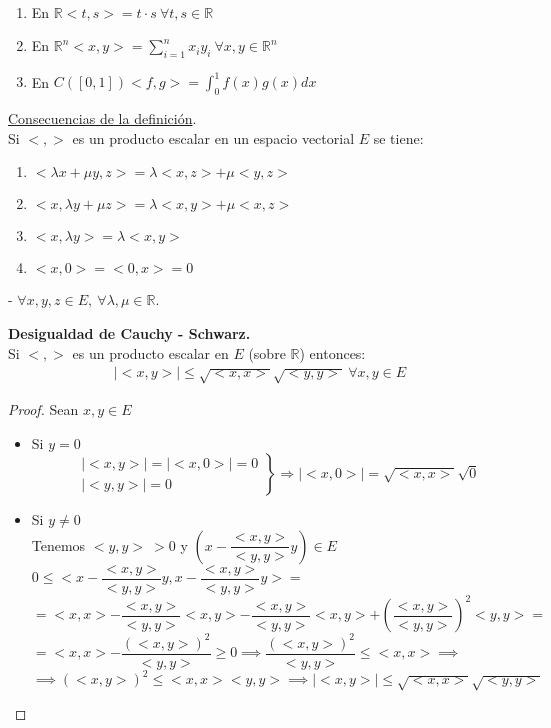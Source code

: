 	\begin{ejem} \ 
		\begin{enumerate}[1)]
	 		\item En $\mathbb{R} <t,s>=t\cdot s \ \forall t,s \in \mathbb{R}$
	 		\item En $\mathbb{R}^n <x,y> = \sum^n_{i=1}x_iy_i \ \forall x,y \in \mathbb{R}^n$
	 		\item En $C([0,1]) <f,g>=\int ^1_0 f(x)g(x)dx$
		\end{enumerate}
	\end{ejem}
	
	\begin{corolario} \underline{Consecuencias de la definici\'on}. \\ 
		Si $<,>$ es un producto escalar en un espacio vectorial $E$ se tiene:
		\begin{enumerate}[1)]
			\item $<\lambda x+ \mu y, z>=\lambda <x,z>+\mu <y,z>$
			\item $<x, \lambda y+\mu z> = \lambda <x,y>+\mu <x,z>$
			\item $<x,\lambda y> = \lambda <x,y>$
			\item $<x,0>=<0,x>=0$
		\end{enumerate}
		- $ \forall x,y,z\in E,\ \forall \lambda,\mu \in\mathbb{R}$.
	\end{corolario}
	
	
	\begin{teor}\textbf{Desigualdad de Cauchy - Schwarz.} \\
	Si $<,>$ es un producto escalar en $E$ (sobre $\mathbb{R}$) entonces:
		\begin{align*}
			|<x,y>|\leq \sqrt{<x,x>}\sqrt{<y,y>} \ \forall x,y \in E
		\end{align*}
		\begin{proof}
			Sean $x,y \in E$
			\begin{itemize}
				\item Si $y=0$ \\
		\[\left.
	       \begin{array}{ll}
		 & |<x,y>|=|<x,0>|=0 \\
		 & |<y,y>|=0 
	       \end{array}
	     \right\} \Rightarrow |<x,0>|=\sqrt{<x,x>} \sqrt{0} \] 	
				\item Si $y\neq 0$\\
		Tenemos $<y,y>\ >0$ y $\left(x-\dfrac{<x,y>}{<y,y>} y\right)\in E$ \\
		$0 \leq <x-\dfrac{<x,y>}{<y,y>}y,x-\dfrac{<x,y>}{<y,y>}y>=$ \\
		$= <x,x>-\dfrac{<x,y>}{<y,y>}<x,y> -\dfrac{<x,y>}{<y,y>}<x,y> + \left(\dfrac{<x,y>}{<y,y>}\right)^2<y,y> = $ \\
		$= <x,x> - \dfrac{(<x,y>)^2}{<y,y>} \geq 0 \implies \dfrac{(<x,y>)^2}{<y,y>} \leq <x,x> \implies$ \\
		$\implies(<x,y>)^2\leq <x,x><y,y> \implies |<x,y>|\leq \sqrt{<x,x>}\sqrt{<y,y>}$
			\end{itemize}
		\end{proof}
	\end{teor}	
	
